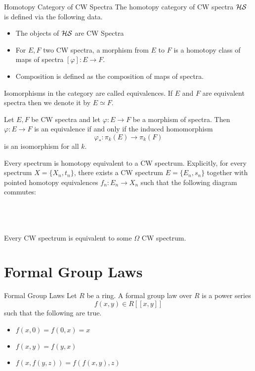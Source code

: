 \documentclass[a4paper]{article}
\begin{document}
\begin{defn}{Homotopy Category of CW Spectra}{} The homotopy category of CW spectra $\mathcal{H}\mathcal{S}$ is defined via the following data. 
\begin{itemize}
\item The objects of $\mathcal{H}\mathcal{S}$ are CW Spectra
\item For $E,F$ two CW spectra, a morphism from $E$ to $F$ is a homotopy class of maps of spectra $[\varphi]:E\to F$. 
\item Composition is defined as the composition of maps of spectra. 
\end{itemize}
Isomorphisms in the category are called equivalences. If $E$ and $F$ are equivalent spectra then we denote it by $E\simeq F$. 
\end{defn}

\begin{thm}{}{} Let $E,F$ be CW spectra and let $\varphi:E\to F$ be a morphism of spectra. Then $\varphi:E\to F$ is an equivalence if and only if the induced homomorphism $$\varphi_\ast:\pi_k(E)\to\pi_k(F)$$ is an isomorphism for all $k$. 
\end{thm}

\begin{thm}{}{} Every spectrum is homotopy equivalent to a CW spectrum. Explicitly, for every spectrum $X=\{X_n,t_n\}$, there exists a CW spectrum $E=\{E_n,s_n\}$ together with pointed homotopy equivalences $f_n:E_n\to X_n$ such that the following diagram commutes: \\~\\
\\~\\
\end{thm}

\begin{thm}{}{} Every CW spectrum is equivalent to some $\Omega$ CW spectrum. 
\end{thm}

\pagebreak
\section{Formal Group Laws}
\begin{defn}{Formal Group Laws}{} Let $R$ be a ring. A formal group law over $R$ is a power series $$f(x,y)\in R[[x,y]]$$ such that the following are true. 
\begin{itemize}
\item $f(x,0)=f(0,x)=x$
\item $f(x,y)=f(y,x)$
\item $f(x,f(y,z))=f(f(x,y),z)$
\end{itemize}
\end{defn}
\end{document}
